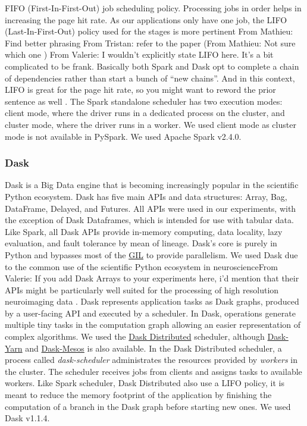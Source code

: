 \documentclass[conference]{IEEEtran}
\newcommand{\TG}[1]{\color{cyan}From Tristan: #1 \color{black}}
\newcommand{\MD}[1]{\color{magenta}From Mathieu: #1 \color{black}}
\newcommand{\VHS}[1]{\color{green}From Valerie: #1 \color{black}}
\begin{document}
FIFO (First-In-First-Out) job scheduling policy. Processing jobs in order helps in
increasing the page hit rate. As our applications only have one job, the LIFO
(Last-In-First-Out) policy used for the stages is more pertinent \MD{Find better
phrasing} \TG{refer to the paper (\MD{Not sure which one})} \VHS{I wouldn't explicitly state LIFO here. It's a bit complicated to be frank. Basically both Spark and Dask opt to complete a chain of dependencies rather than start a bunch of ``new chains''. And in this context, LIFO is great for the page hit rate, so you might want to reword the prior sentence as well}. The Spark standalone
scheduler has two execution modes: client mode, where the driver runs in a dedicated
process on the cluster, and cluster mode, where the driver runs in a worker. We used
client mode as cluster mode is not available in PySpark. We used Apache Spark v2.4.0.

\subsubsection{Dask} Dask is a Big Data engine that is becoming increasingly popular
in the scientific Python ecosystem. Dask has five main APIs and data structures:
Array, Bag, DataFrame, Delayed, and Futures. All APIs were used in our experiments,
with the exception of Dask Dataframes, which is intended for use with tabular data.
Like Spark, all Dask APIs provide
in-memory computing, data locality, lazy evaluation, and fault tolerance by mean of
lineage. Dask's core is purely in Python and bypasses most of the
\href{https://docs.python.org/3/glossary.html#term-gil}{GIL} to provide parallelism.
We used Dask due to the common use of the scientific Python ecosystem in
neuroscience\VHS{If you add Dask Arrays to your experiments here, i'd mention that their
APIs might be particularly well suited for the processing of high resolution neuroimaging data}. Dask represents application tasks as Dask graphs, produced by a
user-facing API and executed by a scheduler. In Dask, operations generate multiple
tiny tasks in the computation graph allowing an easier representation of complex
algorithms. We used the \href{https://distributed.dask.org/en/latest/index.html}{Dask
Distributed} scheduler, although \href{https://github.com/dask/dask-yarn}{Dask-Yarn}
and \href{https://github.com/mrocklin/dask-mesos}{Dask-Mesos} is also available. In
the Dask Distributed scheduler, a process called \textit{dask-scheduler}
administrates the resources provided by \textit{workers} in the cluster. The
scheduler receives jobs from clients and assigns tasks to available workers. Like
Spark scheduler, Dask Distributed also use a LIFO policy, it is meant to reduce the
memory footprint of the application by finishing the computation of a branch in the
Dask graph before starting new ones. We used Dask v1.1.4. 
\end{document}
